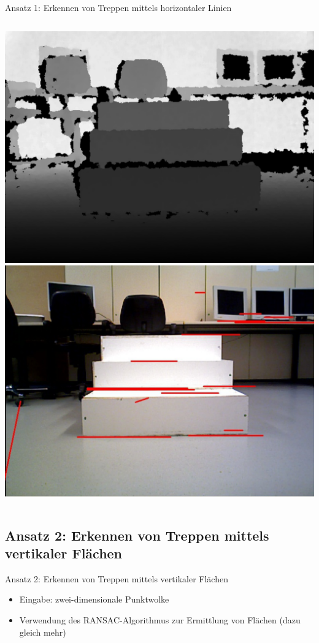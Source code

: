 \documentclass[18pt]{beamer}
\begin{document}
\begin{frame}{Ansatz 1: Erkennen von Treppen mittels horizontaler Linien}
\begin{columns}
		\includegraphics[scale=0.16]{images/canny01.pdf}\newline
		\includegraphics[scale=0.16]{images/canny03.pdf}
	\end{columns}
\end{frame}


\subsection{Ansatz 2: Erkennen von Treppen mittels vertikaler Flächen}
\begin{frame}{Ansatz 2: Erkennen von Treppen mittels vertikaler Flächen}
	\begin{itemize}
		\item Eingabe: zwei-dimensionale Punktwolke
		\item Verwendung des RANSAC-Algorithmus zur Ermittlung von Flächen (dazu gleich mehr)
	\end{itemize}
\end{frame}
\end{document}
